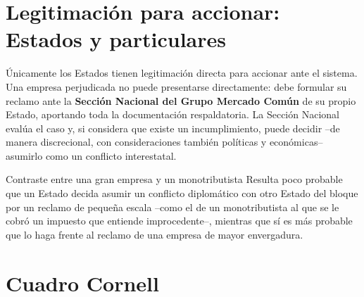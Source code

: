 \documentclass[12pt,oneside]{book}
\begin{document}
\section{Legitimación para accionar: Estados y particulares}

Únicamente los Estados tienen legitimación directa para accionar ante el sistema. Una empresa perjudicada no puede presentarse directamente: debe formular su reclamo ante la \textbf{Sección Nacional del Grupo Mercado Común} de su propio Estado, aportando toda la documentación respaldatoria. La Sección Nacional evalúa el caso y, si considera que existe un incumplimiento, puede decidir --de manera discrecional, con consideraciones también políticas y económicas-- asumirlo como un conflicto interestatal.

\begin{ejemplo}{Contraste entre una gran empresa y un monotributista}
Resulta poco probable que un Estado decida asumir un conflicto diplomático con otro Estado del bloque por un reclamo de pequeña escala --como el de un monotributista al que se le cobró un impuesto que entiende improcedente--, mientras que sí es más probable que lo haga frente al reclamo de una empresa de mayor envergadura.
\end{ejemplo}

\section{Cuadro Cornell}
\end{document}
